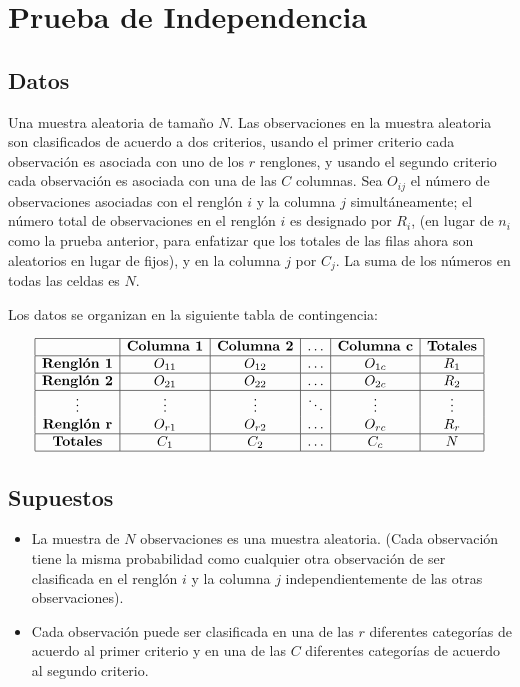 \documentclass[
  a4paper,
  oneside,
  openany]{book}
\begin{document}
\hypertarget{prueba-de-independencia}{%
\chapter{Prueba de Independencia}\label{prueba-de-independencia}}

\hypertarget{datos-11}{%
\section{Datos}\label{datos-11}}

Una muestra aleatoria de tamaño \(N\). Las observaciones en la muestra aleatoria son clasificados de acuerdo a dos criterios, usando el primer criterio cada observación es asociada con uno de los \(r\) renglones, y usando el segundo criterio cada observación es asociada con una de las \(C\) columnas.
Sea \(O_{ij}\) el número de observaciones asociadas con el renglón \(i\) y la columna \(j\) simultáneamente; el número total de observaciones en el renglón \(i\) es designado por \(R_{i}\), (en lugar de \(n_{i}\) como la prueba anterior, para enfatizar que los totales de las filas ahora son aleatorios en lugar de fijos), y en la columna \(j\) por \(C_{j}\). La suma de los números en todas las celdas es \(N\).

Los datos se organizan en la siguiente tabla de contingencia:

\[
\begin{array}{|c|c|c|c|c|c|} 
\hline
&\textbf{Columna 1} &\textbf{Columna 2} &\ldots&\textbf{Columna c}&\textbf{Totales}\\
\hline
\textbf{Renglón 1} &O_{11} &O_{12} &\ldots&O_{1c}&R_1\\
\hline
\textbf{Renglón 2} &O_{21} &O_{22} &\ldots&O_{2c}&R_2\\
\hline
\vdots& \vdots& \vdots& \ddots&\vdots& \vdots\\
\textbf{Renglón r}&O_{r1} &O_{r2} &\ldots&O_{rc}&R_r\\
\hline
\textbf{Totales}&C_1&C_2&\ldots&C_c&N\\
\hline
\end {array}
\]

\hypertarget{supuestos-10}{%
\section{Supuestos}\label{supuestos-10}}

\begin{itemize}
\item
  La muestra de \(N\) observaciones es una muestra aleatoria. (Cada observación tiene la misma probabilidad como cualquier otra observación de ser clasificada en el renglón \(i\) y la columna \(j\) independientemente de las otras observaciones).
\item
  Cada observación puede ser clasificada en una de las \(r\) diferentes categorías de acuerdo al primer criterio y en una de las \(C\) diferentes categorías de acuerdo al segundo criterio.
\end{itemize}
\end{document}
